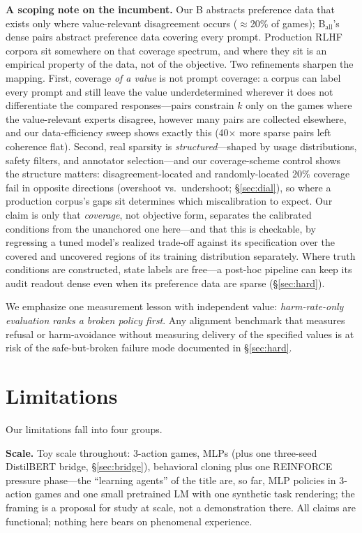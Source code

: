 \documentclass[11pt]{article}
\begin{document}
\textbf{A scoping note on the incumbent.} Our B abstracts preference data that exists only where value-relevant disagreement occurs ($\approx$20\% of games); B$_{\mathrm{all}}$'s dense pairs abstract preference data covering every prompt. Production RLHF corpora sit somewhere on that coverage spectrum, and where they sit is an empirical property of the data, not of the objective. Two refinements sharpen the mapping. First, coverage \emph{of a value} is not prompt coverage: a corpus can label every prompt and still leave the value underdetermined wherever it does not differentiate the compared responses---pairs constrain $k$ only on the games where the value-relevant experts disagree, however many pairs are collected elsewhere, and our data-efficiency sweep shows exactly this (40$\times$ more sparse pairs left coherence flat). Second, real sparsity is \emph{structured}---shaped by usage distributions, safety filters, and annotator selection---and our coverage-scheme control shows the structure matters: disagreement-located and randomly-located 20\% coverage fail in opposite directions (overshoot vs.\ undershoot; \S\ref{sec:dial}), so where a production corpus's gaps sit determines which miscalibration to expect. Our claim is only that \emph{coverage}, not objective form, separates the calibrated conditions from the unanchored one here---and that this is checkable, by regressing a tuned model's realized trade-off against its specification over the covered and uncovered regions of its training distribution separately. Where truth conditions are constructed, state labels are free---a post-hoc pipeline can keep its audit readout dense even when its preference data are sparse (\S\ref{sec:hard}).

We emphasize one measurement lesson with independent value: \emph{harm-rate-only evaluation ranks a broken policy first}. Any alignment benchmark that measures refusal or harm-avoidance without measuring delivery of the specified values is at risk of the safe-but-broken failure mode documented in \S\ref{sec:hard}.

\section{Limitations}
\label{sec:limitations}

Our limitations fall into four groups.

\textbf{Scale.} Toy scale throughout: 3-action games, MLPs (plus one three-seed DistilBERT bridge, \S\ref{sec:bridge}), behavioral cloning plus one REINFORCE pressure phase---the ``learning agents'' of the title are, so far, MLP policies in 3-action games and one small pretrained LM with one synthetic task rendering; the framing is a proposal for study at scale, not a demonstration there. All claims are functional; nothing here bears on phenomenal experience.
\end{document}
